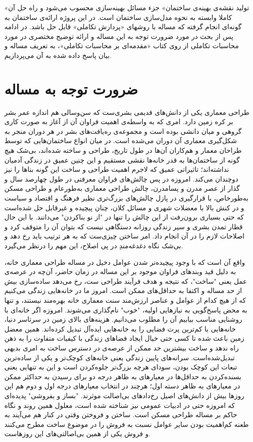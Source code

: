 \documentclass{report}
\begin{document}
«تولید نقشه‌ی بهینه‌ی ساختمان» جزء مسائل بهینه‌سازی محسوب می‌شود و راه حل آن کاملا وابسته به نحوه مدل‌سازی ساختمان است. در این پروژه ارائه‌ی ساختمان به گونه‌ای انجام گرفته که مساله با روشهای «پردازش تکاملی» قابل حل باشد. در ادامه پس از بحث در مورد ضرورت توجه به این مساله و ارائه توضیح مختصری در مورد محاسبات تکاملی از روی کتاب «مقدمه‌ای بر محاسبات تکاملی»\cite{eiben_evolutionary_computing}، به تعریف مساله و بیان پاسخ داده شده به آن می‌پردازیم.

\section{ضرورت توجه به مساله}
طراحی معماری یکی از دانش‌های قدیمی بشری‌ست که سن‌وسالی هم اندازه عمر بشر بر کره زمین دارد. امری که به واسطه‌ی اهمیت فراوان‌ آن از آغاز به صورت کاری گروهی و میان دانشی بوده است و مجموعه‌ی ره‌یافت‌های بشر در هر دوران منجر به شکل‌گیری معماری آن دوران می‌شده است. در میان انواع ساختمان‌هایی که توسط طراحان معمار و هم‌کاران آن‌ها در طول تاریخ، طراحی و ساخته شده‌اند، بی‌شک هیچ گونه‌ از ساختمان‌ها به قدر خانه‌ها نقشی مستقیم و این چنین عمیق در زندگی آدمیان نداشته‌اند؛ تاثیراتی عمیق که لاجرم اهمیت طراحی و ساخت این گونه بناها را نیز دوچندان می‌کند. امروزه در پس چالش‌های فراوان معرفتی در طول چهارصد سال و گذار از عصر مدرن و پسامدرن، چالش طراحی معماری به‌طورعام و طراحی مسکن به‌طورخاص، با قرارگیری در پازل چالش‌های بزرگ‌تری نظیر فرهنگ و اقتصاد و سیاست و در کنش بالا با معضلات شهری و مسائل کلان، چنان پیچیده و غیرقابل حل شده‌است که حتی بسیاری برون‌رفت از این چالش را تنها در "از نو بناکردن" می‌دانند. با این حال قطار تمدن بشری و سیر زندگی روزانه دستگاهی نیست که بتوان آن را متوقف کرد و اصلاحات لازم را در آن انجام داد. امر ساختن چیزی‌ست که به هر ترتیب باید رخ دهد و بی‌شک نگاه دغدغه‌مندِ در پی اصلاح، این مهم را درنظر می‌گیرد.

واقع آن است که با وجود پیچیده‌تر شدن عوامل دخیل در مساله طراحی معماری خانه، به دلیل قید وبندهای فراوان موجود بر این مساله در زمان حاضر، آن‌چه در عرصه‌ی عمل یعنی "ساخت"، که نتیجه و هدف فرآیند طراحی ست، رخ می‌دهد ساده‌سازی بیش از حد مساله و اکتفا به حداقل‌های ممکن است. امروز ما در خانه‌هایی زندگی می‌کنیم که از هیچ کدام از عوامل و عناصر ارزش‌مند سنت معماری خانه بهره‌مند نیستند، و تنها به محض پاسخ‌گویی به نیازهایی اولیه، "خوب" نام‌گذاری می‌شوند. امروزه اگر خانه‌ای با روشنایی مناسب بیابیم آن را مطلوب می‌دانیم. هزینه‌های بالای زمین در سرتاسر دنیا، خانه‌هایی با کم‌ترین پرت فضایی را به خانه‌هایی ایده‌آل تبدیل کرده‌اند. همین معضل زمین باعث شده تا کسی حتی خیال ایجاد فضاهای زندگی با کیفیات متفاوت را به ذهن راه ندهد و ساخت بیشترین حد ممکن از عرصه‌ی در دسترس ساخت به امری بدیهی تبدیل‌شده‌است. سرانه‌های پایین زندگی یعنی خانه‌های کوچک‌تر و یکی از ساده‌ترین تبعات این کوچک‌ بودن، سودای هرچه بزرگ‌تر جلوه‌کردن است و این به تنهایی یعنی بسنده‌کردن به حداقل‌ها در معیارهای به ظاهر درجه دو برای رسیدن به حداکثر ممکن در معیارهای به ظاهر دسته اول؛ هرچند در انتخاب معیارهای درجه اول و دوم هم این روزها بیش از دانش‌های اصیل رخ‌دادهای بی‌اصالت موثرند. "بساز و بفروشی" پدید‌ه‌ای که امروزه حتی در ادبیات عمومی نیز شناخته شده است، معلول همین روند و نگاه حاکم بر مساله طراحی مسکن است. ساختن و فروختن وقتی در کنار هم می‌آیند به طعنه کم‌اهمیت بودن سایر عوامل نسبت به فروش را در موضوع ساخت مطرح می‌کنند و فروش یکی از همین بی‌اصالتی‌های این روزهاست.
\end{document}
